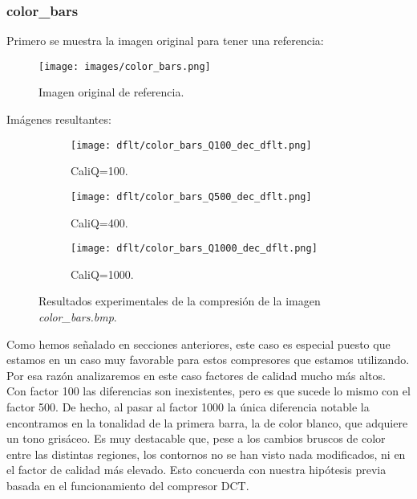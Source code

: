 \documentclass[12pt,a4paper]{article}
\begin{document}
\subsubsection{color\_bars}
Primero se muestra la imagen original para tener una referencia:
\begin{figure}[H]
    \centering
    \texttt{[image: images/color\_bars.png]}
    \caption[Referencia - color\_bars]{Imagen original de referencia.}
    
\end{figure}

\vspace{0.5cm}

Imágenes resultantes:
\begin{figure}   [H]
    \begin{subfigure}{0.30\textwidth}
        \centering
        \texttt{[image: dflt/color\_bars\_Q100\_dec\_dflt.png]}
        \caption{CaliQ=100.}
        
    \end{subfigure}
    \hfill
    \begin{subfigure}{0.30\textwidth}
        \centering
        \texttt{[image: dflt/color\_bars\_Q500\_dec\_dflt.png]}
        \caption{CaliQ=400.}
        
    \end{subfigure}
    \hfill
    \begin{subfigure}{0.30\textwidth}
        \centering
        \texttt{[image: dflt/color\_bars\_Q1000\_dec\_dflt.png]}
        \caption{CaliQ=1000.}
        
    \end{subfigure}
    
    \caption[Resultados experimentales - color\_bars]{Resultados experimentales de la compresión de la imagen \textit{color\_bars.bmp}.}
    
\end{figure}

Como hemos señalado en secciones anteriores, este caso es especial puesto que estamos en un caso muy favorable para estos compresores que estamos utilizando. Por esa razón analizaremos en este caso factores de calidad mucho más altos.\\

Con factor 100 las diferencias son inexistentes, pero es que sucede lo mismo con el factor 500. De hecho, al pasar al factor 1000 la única diferencia notable la encontramos en la tonalidad de la primera barra, la de color blanco, que adquiere un tono grisáceo. Es muy destacable que, pese a los cambios bruscos de color entre las distintas regiones, los contornos no se han visto nada modificados, ni en el factor de calidad más elevado. Esto concuerda con nuestra hipótesis previa basada en el funcionamiento del compresor DCT.\\
\end{document}
